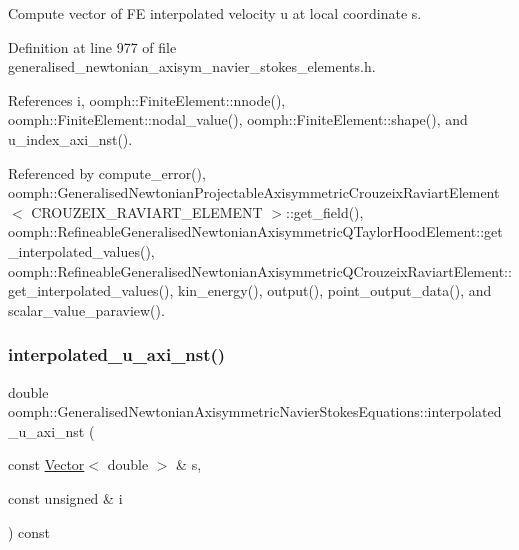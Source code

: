 Compute vector of FE interpolated velocity u at local coordinate s. 



Definition at line 977 of file generalised\+\_\+newtonian\+\_\+axisym\+\_\+navier\+\_\+stokes\+\_\+elements.\+h.



References i, oomph\+::\+Finite\+Element\+::nnode(), oomph\+::\+Finite\+Element\+::nodal\+\_\+value(), oomph\+::\+Finite\+Element\+::shape(), and u\+\_\+index\+\_\+axi\+\_\+nst().



Referenced by compute\+\_\+error(), oomph\+::\+Generalised\+Newtonian\+Projectable\+Axisymmetric\+Crouzeix\+Raviart\+Element$<$ C\+R\+O\+U\+Z\+E\+I\+X\+\_\+\+R\+A\+V\+I\+A\+R\+T\+\_\+\+E\+L\+E\+M\+E\+N\+T $>$\+::get\+\_\+field(), oomph\+::\+Refineable\+Generalised\+Newtonian\+Axisymmetric\+Q\+Taylor\+Hood\+Element\+::get\+\_\+interpolated\+\_\+values(), oomph\+::\+Refineable\+Generalised\+Newtonian\+Axisymmetric\+Q\+Crouzeix\+Raviart\+Element\+::get\+\_\+interpolated\+\_\+values(), kin\+\_\+energy(), output(), point\+\_\+output\+\_\+data(), and scalar\+\_\+value\+\_\+paraview().

\mbox{\label{classoomph_1_1GeneralisedNewtonianAxisymmetricNavierStokesEquations_a186be2522c8c7d91ce98f467632bb8e1}} 
\subsubsection{\texorpdfstring{interpolated\+\_\+u\+\_\+axi\+\_\+nst()}{interpolated\_u\_axi\_nst()}\hspace{0.1cm}{\footnotesize\ttfamily [2/3]}}
{\footnotesize\ttfamily double oomph\+::\+Generalised\+Newtonian\+Axisymmetric\+Navier\+Stokes\+Equations\+::interpolated\+\_\+u\+\_\+axi\+\_\+nst (\begin{DoxyParamCaption}\item[{const \hyperlink{classoomph_1_1Vector}{Vector}$<$ double $>$ \&}]{s,  }\item[{const unsigned \&}]{i }\end{DoxyParamCaption}) const\hspace{0.3cm}{\ttfamily [inline]}}




